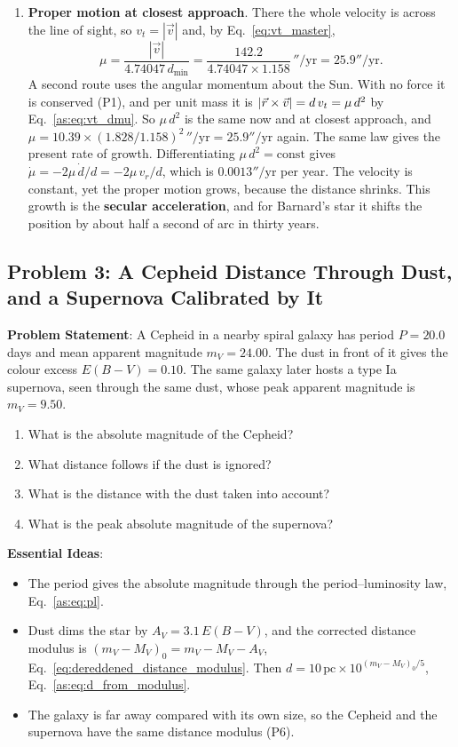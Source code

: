 \begin{enumerate}[label=(\alph*)]
	\item \textbf{Proper motion at closest approach}. There the whole velocity is across the line of sight, so $v_t = |\vec v|$ and, by Eq.~\eqref{eq:vt_master},
	\[
	\boxed{\mu = \frac{|\vec v|}{4.74047\,d_{\min}} = \frac{142.2}{4.74047\times1.158}\,''/\mathrm{yr} = 25.9''/\mathrm{yr}.}
	\]
	A second route uses the angular momentum about the Sun. With no force it is conserved (P1), and per unit mass it is $|\vec r\times\vec v| = d\,v_t = \mu\,d^2$ by Eq.~\eqref{as:eq:vt_dmu}. So $\mu\,d^2$ is the same now and at closest approach, and $\mu = 10.39\times(1.828/1.158)^2\,''/\mathrm{yr} = 25.9''/\mathrm{yr}$ again. The same law gives the present rate of growth. Differentiating $\mu\,d^2=\text{const}$ gives $\dot\mu = -2\mu\,\dot d/d = -2\mu\,v_r/d$, which is $0.0013''/\mathrm{yr}$ per year. The velocity is constant, yet the proper motion grows, because the distance shrinks. This growth is the \textbf{secular acceleration}, and for Barnard's star it shifts the position by about half a second of arc in thirty years.
\end{enumerate}

\subsection{Problem 3: A Cepheid Distance Through Dust, and a Supernova Calibrated by It}
\label{as:prob:cepheid}

\textbf{Problem Statement}: A Cepheid in a nearby spiral galaxy has period $P=20.0$ days and mean apparent magnitude $m_V=24.00$. The dust in front of it gives the colour excess $E(B-V)=0.10$. The same galaxy later hosts a type Ia supernova, seen through the same dust, whose peak apparent magnitude is $m_V=9.50$.
\begin{enumerate}[label=(\alph*)]
	\item What is the absolute magnitude of the Cepheid?
	\item What distance follows if the dust is ignored?
	\item What is the distance with the dust taken into account?
	\item What is the peak absolute magnitude of the supernova?
\end{enumerate}

\textbf{Essential Ideas}:
\begin{itemize}
	\item The period gives the absolute magnitude through the period--luminosity law, Eq.~\eqref{as:eq:pl}.
	\item Dust dims the star by $A_V=3.1\,E(B-V)$, and the corrected distance modulus is $(m_V-M_V)_0=m_V-M_V-A_V$, Eq.~\eqref{eq:dereddened_distance_modulus}. Then $d=10\,\mathrm{pc}\times10^{(m_V-M_V)_0/5}$, Eq.~\eqref{as:eq:d_from_modulus}.
	\item The galaxy is far away compared with its own size, so the Cepheid and the supernova have the same distance modulus (P6).
\end{itemize}

